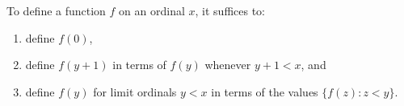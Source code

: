 To define a function $f$ on an ordinal $x$, it suffices to:
\begin{enumerate}
\item define $f(0)$,
\item define $f(y+1)$ in terms of $f(y)$ whenever $y+1 < x$, and
\item define $f(y)$ for limit ordinals $y < x$ in terms of the values $\{f(z) : z < y\}$.
\end{enumerate}
